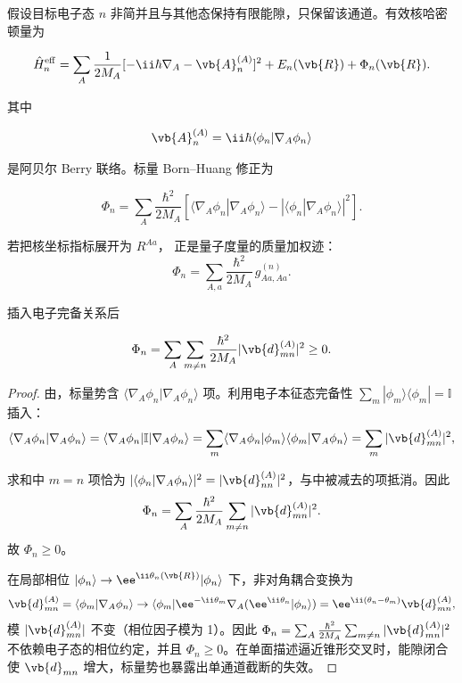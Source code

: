 假设目标电子态 \(n\) 非简并且与其他态保持有限能隙，只保留该通道。有效核哈密顿量为

\begin{equation}
\hat H_n^{\rm eff}
=\sum_A\frac{1}{2M_A}
[-\ii\hbar\nabla_A-\vb{A}_n^{(A)}]^2
+E_n(\vb{R})+\Phi_n(\vb{R}).
\label{eq:berry-scalar}
\end{equation}

其中

\[
\vb{A}_n^{(A)}
=\ii\hbar\langle\phi_n|\nabla_A\phi_n\rangle
\]

是阿贝尔 Berry 联络。标量 Born--Huang 修正为

\begin{equation}
\Phi_n
=\sum_A\frac{\hbar^2}{2M_A}
\left[
\langle\nabla_A\phi_n|\nabla_A\phi_n\rangle
-|\langle\phi_n|\nabla_A\phi_n\rangle|^2
\right].
\label{eq:born-huang-scalar}
\end{equation}

若把核坐标指标展开为 \(R^{Aa}\)， 正是量子度量的质量加权迹：
\begin{equation}
\Phi_n
=\sum_{A,a}\frac{\hbar^2}{2M_A}\,
g^{(n)}_{Aa,Aa}.
\label{eq:born-huang-qgt-trace}
\end{equation}

插入电子完备关系后

\[
\Phi_n
=\sum_A\sum_{m\neq n}
\frac{\hbar^2}{2M_A}
|\vb{d}_{mn}^{(A)}|^2\ge0.
\]

\begin{proof}
由，标量势含 \(\langle\nabla_A\phi_n|\nabla_A\phi_n\rangle\) 项。利用电子本征态完备性 \(\sum_m|\phi_m\rangle\langle\phi_m|=\mathbb I\) 插入：
\begin{equation*}
\langle\nabla_A\phi_n|\nabla_A\phi_n\rangle
=\langle\nabla_A\phi_n|\mathbb I|\nabla_A\phi_n\rangle
=\sum_m\langle\nabla_A\phi_n|\phi_m\rangle\langle\phi_m|\nabla_A\phi_n\rangle
=\sum_m|\vb{d}_{mn}^{(A)}|^2,
\end{equation*}


求和中 \(m=n\) 项恰为 \(|\langle\phi_n|\nabla_A\phi_n\rangle|^2=|\vb{d}_{nn}^{(A)}|^2\)，与中被减去的项抵消。因此
\begin{equation*}
\Phi_n=\sum_A\frac{\hbar^2}{2M_A}\sum_{m\neq n}|\vb{d}_{mn}^{(A)}|^2.
\end{equation*}
故 \(\Phi_n\ge0\)。

在局部相位 \(|\phi_n\rangle\to\ee^{\ii\theta_n(\vb{R})}|\phi_n\rangle\) 下，非对角耦合变换为
\begin{equation*}
\vb{d}_{mn}^{(A)}=\langle\phi_m|\nabla_A\phi_n\rangle
\to\langle\phi_m|\ee^{-\ii\theta_m}\nabla_A(\ee^{\ii\theta_n}|\phi_n\rangle)
=\ee^{\ii(\theta_n-\theta_m)}\vb{d}_{mn}^{(A)},
\end{equation*}
模 \(|\vb{d}_{mn}^{(A)}|\) 不变（相位因子模为 1）。因此 \(\Phi_n=\sum_A\frac{\hbar^2}{2M_A}\sum_{m\neq n}|\vb{d}_{mn}^{(A)}|^2\) 不依赖电子态的相位约定，并且 \(\Phi_n\ge0\)。在单面描述逼近锥形交叉时，能隙闭合使 \(\vb{d}_{mn}\) 增大，标量势也暴露出单通道截断的失效。

\end{proof}

